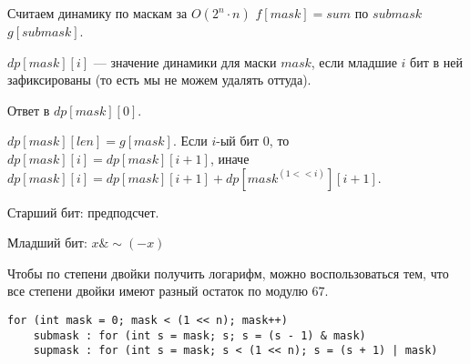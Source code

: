 Считаем динамику по маскам за $O(2^n \cdot n)$ $f[mask] = sum$ по $submask$ $g[submask]$.

$dp[mask][i]$ --- значение динамики для маски $mask$, если младшие $i$ бит в ней зафиксированы (то есть мы не можем удалять оттуда).

Ответ в $dp[mask][0]$.

$dp[mask][len] = g[mask]$.
Если $i$-ый бит 0, то $dp[mask][i] = dp[mask][i + 1]$, иначе $dp[mask][i] = dp[mask][i + 1] + dp[mask ^ (1 << i)][i + 1]$.

Старший бит: предподсчет.
 
Младший бит: $x \& \sim (-x)$ 

Чтобы по степени двойки получить логарифм, можно воспользоваться тем, что все степени двойки имеют разный остаток по модулю $67$.

\begin{verbatim}
for (int mask = 0; mask < (1 << n); mask++)
	submask : for (int s = mask; s; s = (s - 1) & mask)
	supmask : for (int s = mask; s < (1 << n); s = (s + 1) | mask)
\end{verbatim}

